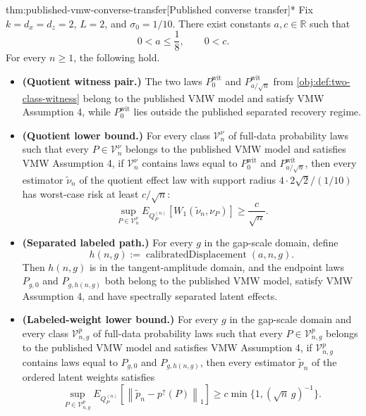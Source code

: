 \begin{theoremv}{thm:published-vmw-converse-transfer}[Published converse transfer]*
Fix \(k=d_x=d_z=2\), \(L=2\), and \(\sigma_0=1/10\).  There exist constants \(a,c\in\mathbb R\) such that
\[
0<a\le \frac18,
\qquad
0<c .
\]
For every \(n\ge 1\), the following hold.
\begin{itemize}
\item \textbf{(Quotient witness pair.)} The two laws \(P_0^{\mathrm{wit}}\) and \(P_{a/\sqrt n}^{\mathrm{wit}}\) from \cref{obj:def:two-class-witness} belong to the published VMW model and satisfy VMW Assumption 4, while \(P_0^{\mathrm{wit}}\) lies outside the published separated recovery regime.
\item \textbf{(Quotient lower bound.)} For every class \(\mathcal V_n^\nu\) of full-data probability laws such that every \(P\in\mathcal V_n^\nu\) belongs to the published VMW model and satisfies VMW Assumption 4, if \(\mathcal V_n^\nu\) contains laws equal to \(P_0^{\mathrm{wit}}\) and \(P_{a/\sqrt n}^{\mathrm{wit}}\), then every estimator \(\widetilde\nu_n\) of the quotient effect law with support radius \(4\cdot 2\sqrt2/(1/10)\) has worst-case risk at least \(c/\sqrt n\):
\[
\sup_{P\in\mathcal V_n^\nu}
E_{Q_P^{(n)}}\!\left[
W_1\!\left(\widetilde\nu_n,\nu_P\right)
\right]
\ge \frac{c}{\sqrt n}.
\]
\item \textbf{(Separated labeled path.)} For every \(g\) in the gap-scale domain, define
\[
h(n,g):=\operatorname{calibratedDisplacement}(a,n,g).
\]
Then \(h(n,g)\) is in the tangent-amplitude domain, and the endpoint laws \(P_{g,0}\) and \(P_{g,h(n,g)}\) both belong to the published VMW model, satisfy VMW Assumption 4, and have spectrally separated latent effects.
\item \textbf{(Labeled-weight lower bound.)} For every \(g\) in the gap-scale domain and every class \(\mathcal V_{n,g}^p\) of full-data probability laws such that every \(P\in\mathcal V_{n,g}^p\) belongs to the published VMW model and satisfies VMW Assumption 4, if \(\mathcal V_{n,g}^p\) contains laws equal to \(P_{g,0}\) and \(P_{g,h(n,g)}\), then every estimator \(\widetilde p_n\) of the ordered latent weights satisfies
\[
\sup_{P\in\mathcal V_{n,g}^p}
E_{Q_P^{(n)}}\!\left[
\left\|\widetilde p_n-p^{\uparrow}(P)\right\|_1
\right]
\ge
c\min\{1,(\sqrt n\,g)^{-1}\}.
\]
\end{itemize}
\end{theoremv}

